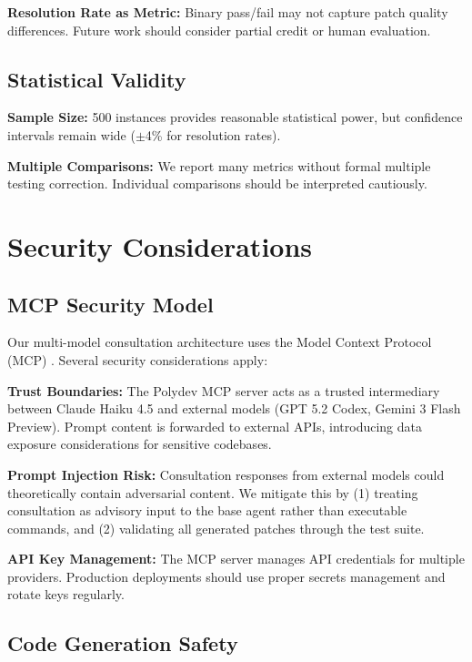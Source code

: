 \documentclass[11pt,a4paper]{article}
\begin{document}
\textbf{Resolution Rate as Metric:} Binary pass/fail may not capture patch quality differences. Future work should consider partial credit or human evaluation.

\subsection{Statistical Validity}

\textbf{Sample Size:} 500 instances provides reasonable statistical power, but confidence intervals remain wide ($\pm$4\% for resolution rates).

\textbf{Multiple Comparisons:} We report many metrics without formal multiple testing correction. Individual comparisons should be interpreted cautiously.

\section{Security Considerations}

\subsection{MCP Security Model}

Our multi-model consultation architecture uses the Model Context Protocol (MCP) \citep{anthropic2024mcp,linuxfoundation2025mcp}. Several security considerations apply:

\textbf{Trust Boundaries:} The Polydev MCP server acts as a trusted intermediary between Claude Haiku 4.5 and external models (GPT 5.2 Codex, Gemini 3 Flash Preview). Prompt content is forwarded to external APIs, introducing data exposure considerations for sensitive codebases.

\textbf{Prompt Injection Risk:} Consultation responses from external models could theoretically contain adversarial content. We mitigate this by (1) treating consultation as advisory input to the base agent rather than executable commands, and (2) validating all generated patches through the test suite.

\textbf{API Key Management:} The MCP server manages API credentials for multiple providers. Production deployments should use proper secrets management and rotate keys regularly.

\subsection{Code Generation Safety}
\end{document}
